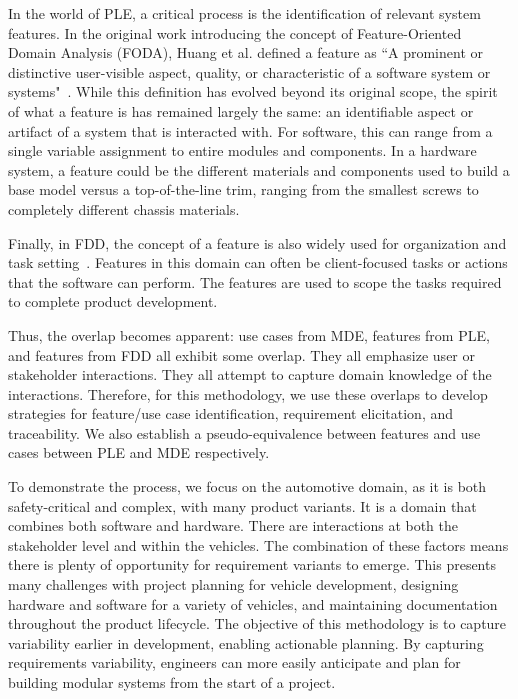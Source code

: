 In the world of \gls{PLE}, a critical process is the identification of relevant system features. In the original work introducing the concept of Feature-Oriented Domain Analysis (FODA), Huang et al. defined a feature as ``A prominent or distinctive user-visible aspect, quality, or characteristic of a software system or systems"~\cite{kang1990feature}. While this definition has evolved beyond its original scope, the spirit of what a feature is has remained largely the same: an identifiable aspect or artifact of a system that is interacted with. For software, this can range from a single variable assignment to entire modules and components. In a hardware system, a feature could be the different materials and components used to build a base model versus a top-of-the-line trim, ranging from the smallest screws to completely different chassis materials.

Finally, in \gls{FDD}, the concept of a feature is also widely used for organization and task setting~\cite{palmer2001practical}. Features in this domain can often be client-focused tasks or actions that the software can perform. The features are used to scope the tasks required to complete product development. 

Thus, the overlap becomes apparent: use cases from \gls{MDE}, features from \gls{PLE}, and features from \gls{FDD} all exhibit some overlap. They all emphasize user or stakeholder interactions. They all attempt to capture domain knowledge of the interactions. Therefore, for this methodology, we use these overlaps to develop strategies for feature/use case identification, requirement elicitation, and traceability. We also establish a pseudo-equivalence between features and use cases between \gls{PLE} and \gls{MDE} respectively.

To demonstrate the process, we focus on the automotive domain, as it is both safety-critical and complex, with many product variants. It is a domain that combines both software and hardware. There are interactions at both the stakeholder level and within the vehicles. The combination of these factors means there is plenty of opportunity for requirement variants to emerge. This presents many challenges with project planning for vehicle development, designing hardware and software for a variety of vehicles, and maintaining documentation throughout the product lifecycle. The objective of this methodology is to capture variability earlier in development, enabling actionable planning. By capturing requirements variability, engineers can more easily anticipate and plan for building modular systems from the start of a project.

